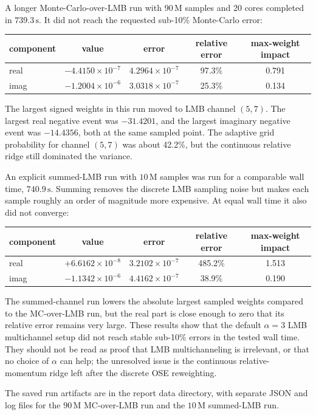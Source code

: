 \documentclass[11pt]{article}
\begin{document}
A longer Monte-Carlo-over-LMB run with $90\,\mathrm{M}$ samples and 20 cores
completed in $739.3\,\mathrm{s}$.  It did not reach the requested sub-10\%
Monte-Carlo error:
\begin{center}
\begin{tabular}{lcccc}
\toprule
component & value & error & relative error & max-weight impact\\
\midrule
real & $-4.4150\times 10^{-7}$ & $4.2964\times 10^{-7}$ & 97.3\% & 0.791\\
imag & $-1.2004\times 10^{-6}$ & $3.0318\times 10^{-7}$ & 25.3\% & 0.134\\
\bottomrule
\end{tabular}
\end{center}
The largest signed weights in this run moved to LMB channel $(5,7)$.  The
largest real negative event was $-31.4201$, and the largest imaginary negative
event was $-14.4356$, both at the same sampled point.  The adaptive grid
probability for channel $(5,7)$ was about 42.2\%, but the continuous relative
ridge still dominated the variance.

An explicit summed-LMB run with $10\,\mathrm{M}$ samples was run for a
comparable wall time, $740.9\,\mathrm{s}$.  Summing removes the discrete LMB
sampling noise but makes each sample roughly an order of magnitude more
expensive.  At equal wall time it also did not converge:
\begin{center}
\begin{tabular}{lcccc}
\toprule
component & value & error & relative error & max-weight impact\\
\midrule
real & $+6.6162\times 10^{-8}$ & $3.2102\times 10^{-7}$ & 485.2\% & 1.513\\
imag & $-1.1342\times 10^{-6}$ & $4.4162\times 10^{-7}$ & 38.9\% & 0.190\\
\bottomrule
\end{tabular}
\end{center}
The summed-channel run lowers the absolute largest sampled weights compared to
the MC-over-LMB run, but the real part is close enough to zero that its
relative error remains very large.  These results show that the default
$\alpha=3$ LMB multichannel setup did not reach stable sub-10\% errors in the
tested wall time.  They should not be read as proof that LMB multichanneling is
irrelevant, or that no choice of $\alpha$ can help; the unresolved issue is the
continuous relative-momentum ridge left after the discrete OSE reweighting.

The saved run artifacts are in the report data directory, with separate JSON
and log files for the \(90\,\mathrm{M}\) MC-over-LMB run and the \(10\,\mathrm{M}\)
summed-LMB run.
\end{document}
